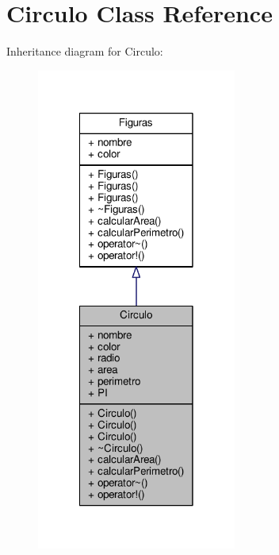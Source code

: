 \hypertarget{class_circulo}{}\section{Circulo Class Reference}
\label{class_circulo}


Inheritance diagram for Circulo\+:
\nopagebreak
\begin{figure}[H]
\begin{center}
\leavevmode
\includegraphics[width=186pt]{class_circulo__inherit__graph}
\end{center}
\end{figure}


